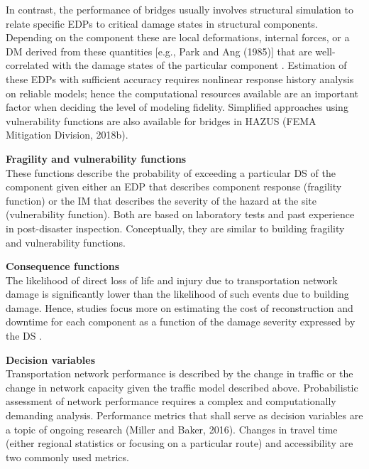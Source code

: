 In contrast, the performance of bridges usually involves structural simulation to relate specific EDPs to critical damage states in structural components. Depending on the component these are local deformations, internal forces, or a DM derived from these quantities [e.g., Park and Ang (1985)] that are well-correlated with the damage states of the particular component \citep{choi2004seismic}. Estimation of these EDPs with sufficient accuracy requires nonlinear response history analysis on reliable models; hence the computational resources available are an important factor when deciding the level of modeling fidelity. Simplified approaches using vulnerability functions are also available for bridges in HAZUS (FEMA Mitigation Division, 2018b).
\newline

\noindent\textbf{Fragility and vulnerability functions} \\These functions describe the probability of exceeding a particular DS of the component given either an EDP that describes component response (fragility function) or the IM that describes the severity of the hazard at the site (vulnerability function). Both are based on laboratory tests and past experience in post-disaster inspection. Conceptually, they are similar to building fragility and vulnerability functions.
\newline

\noindent\textbf{Consequence functions} \\The likelihood of direct loss of life and injury due to transportation network damage is significantly lower than the likelihood of such events due to building damage. Hence, studies focus more on estimating the cost of reconstruction and downtime for each component as a function of the damage severity expressed by the DS \citep{stergiou2006treatment}. 
\newline

\noindent\textbf{Decision variables} \\Transportation network performance is described by the change in traffic or the change in network capacity given the traffic model described above. Probabilistic assessment of network performance requires a complex and computationally demanding analysis. Performance metrics that shall serve as decision variables are a topic of ongoing research (Miller and Baker, 2016). Changes in travel time (either regional statistics or focusing on a particular route) and accessibility are two commonly used metrics.

